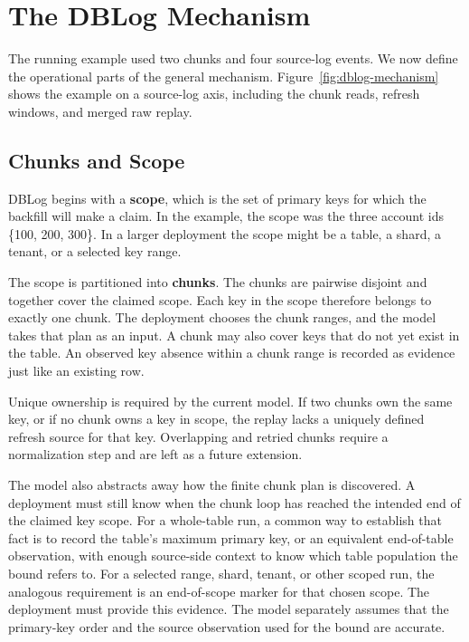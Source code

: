 \documentclass[letterpaper,10pt,twocolumn]{article}
\begin{document}
\section{The DBLog Mechanism}\label{the-dblog-mechanism}

The running example used two chunks and four source-log events. We now
define the operational parts of the general mechanism. Figure~\ref{fig:dblog-mechanism}
shows the example on a source-log axis, including the chunk reads,
refresh windows, and merged raw replay.

\begin{figure}[t]
  
\end{figure}

\subsection{Chunks and Scope}\label{chunks-and-scope}

DBLog begins with a \textbf{scope}, which is the set of primary keys for
which the backfill will make a claim. In the example, the scope was the three
account ids \{100, 200, 300\}. In a larger deployment the scope might be
a table, a shard, a tenant, or a selected key range.

The scope is partitioned into \textbf{chunks}. The chunks are pairwise
disjoint and together cover the claimed scope. Each key in the scope
therefore belongs to exactly one chunk. The deployment chooses the
chunk ranges, and the model takes that plan as an input. A chunk may
also cover keys that do not yet exist in the table. An observed key absence
within a chunk range is recorded as evidence just like an existing row.

Unique ownership is required by the current model. If two chunks own
the same key, or if no chunk owns a key in scope, the replay lacks a
uniquely defined refresh source for that key. Overlapping and retried chunks
require a normalization step and are left as a future extension.

The model also abstracts away how the finite chunk plan is discovered.
A deployment must still know when the chunk loop has reached the
intended end of the claimed key scope. For a whole-table run, a common
way to establish that fact is to record the table's maximum primary key,
or an equivalent end-of-table observation, with enough source-side
context to know which table population the bound refers to. For a
selected range, shard, tenant, or other scoped run, the analogous
requirement is an end-of-scope marker for that chosen scope. The
deployment must provide this evidence. The model separately assumes that
the primary-key order and the source observation used for the bound are
accurate.
\end{document}
